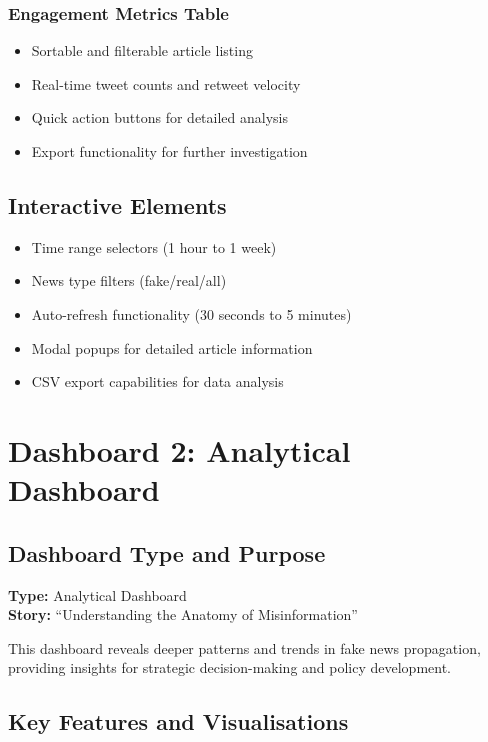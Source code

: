 \documentclass[12pt,a4paper]{article}
\begin{document}
\subsubsection{Engagement Metrics Table}
\begin{itemize}
    \item Sortable and filterable article listing
    \item Real-time tweet counts and retweet velocity
    \item Quick action buttons for detailed analysis
    \item Export functionality for further investigation
\end{itemize}

\subsection{Interactive Elements}
\begin{itemize}
    \item Time range selectors (1 hour to 1 week)
    \item News type filters (fake/real/all)
    \item Auto-refresh functionality (30 seconds to 5 minutes)
    \item Modal popups for detailed article information
    \item CSV export capabilities for data analysis
\end{itemize}

\section{Dashboard 2: Analytical Dashboard}

\subsection{Dashboard Type and Purpose}
\textbf{Type:} Analytical Dashboard \\
\textbf{Story:} ``Understanding the Anatomy of Misinformation''

This dashboard reveals deeper patterns and trends in fake news propagation, providing insights for strategic decision-making and policy development.

\subsection{Key Features and Visualisations}
\end{document}
